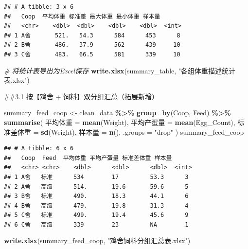 \documentclass[
]{article}
\newenvironment{Shaded}{\begin{snugshade}}{\end{snugshade}}
\newcommand{\AttributeTok}[1]{\textcolor[rgb]{0.13,0.29,0.53}{#1}}
\newcommand{\CommentTok}[1]{\textcolor[rgb]{0.56,0.35,0.01}{\textit{#1}}}
\newcommand{\FunctionTok}[1]{\textcolor[rgb]{0.13,0.29,0.53}{\textbf{#1}}}
\newcommand{\NormalTok}[1]{#1}
\newcommand{\OtherTok}[1]{\textcolor[rgb]{0.56,0.35,0.01}{#1}}
\newcommand{\SpecialCharTok}[1]{\textcolor[rgb]{0.81,0.36,0.00}{\textbf{#1}}}
\newcommand{\StringTok}[1]{\textcolor[rgb]{0.31,0.60,0.02}{#1}}
\begin{document}
\begin{verbatim}
## # A tibble: 3 x 6
##   Coop  平均体重 标准差 最大体重 最小体重 样本量
##   <chr>    <dbl>  <dbl>    <dbl>    <dbl>  <int>
## 1 A舍       521.   54.3      584      453      8
## 2 B舍       486.   37.9      562      439     10
## 3 C舍       483.   66.5      581      339     10
\end{verbatim}

\begin{Shaded}
\begin{Highlighting}[]
\CommentTok{\# 将统计表导出为Excel保存}
\FunctionTok{write.xlsx}\NormalTok{(summary\_table, }\StringTok{"各组体重描述统计表.xlsx"}\NormalTok{)}
\end{Highlighting}
\end{Shaded}

\#\#3.1 按【鸡舍 + 饲料】双分组汇总（拓展新增）

\begin{Shaded}
\begin{Highlighting}[]
\NormalTok{summary\_feed\_coop }\OtherTok{\textless{}{-}}\NormalTok{ clean\_data }\SpecialCharTok{\%\textgreater{}\%}
  \FunctionTok{group\_by}\NormalTok{(Coop, Feed) }\SpecialCharTok{\%\textgreater{}\%}
  \FunctionTok{summarise}\NormalTok{(}
\NormalTok{    平均体重 }\OtherTok{=} \FunctionTok{mean}\NormalTok{(Weight),}
\NormalTok{    平均产蛋量 }\OtherTok{=} \FunctionTok{mean}\NormalTok{(Egg\_Count),}
\NormalTok{    标准差体重 }\OtherTok{=} \FunctionTok{sd}\NormalTok{(Weight),}
\NormalTok{    样本量 }\OtherTok{=} \FunctionTok{n}\NormalTok{(),}
    \AttributeTok{.groups =} \StringTok{"drop"}
\NormalTok{  )}
\NormalTok{summary\_feed\_coop}
\end{Highlighting}
\end{Shaded}

\begin{verbatim}
## # A tibble: 6 x 6
##   Coop  Feed  平均体重 平均产蛋量 标准差体重 样本量
##   <chr> <chr>    <dbl>      <dbl>      <dbl>  <int>
## 1 A舍   标准      534        17         53.3      3
## 2 A舍   高级      514.       19.6       59.6      5
## 3 B舍   标准      490.       18.3       44.1      6
## 4 B舍   高级      479.       19.8       31.3      4
## 5 C舍   标准      499.       19.4       45.6      9
## 6 C舍   高级      339        23         NA        1
\end{verbatim}

\begin{Shaded}
\begin{Highlighting}[]
\FunctionTok{write.xlsx}\NormalTok{(summary\_feed\_coop, }\StringTok{"鸡舍饲料分组汇总表.xlsx"}\NormalTok{)}
\end{Highlighting}
\end{Shaded}
\end{document}
